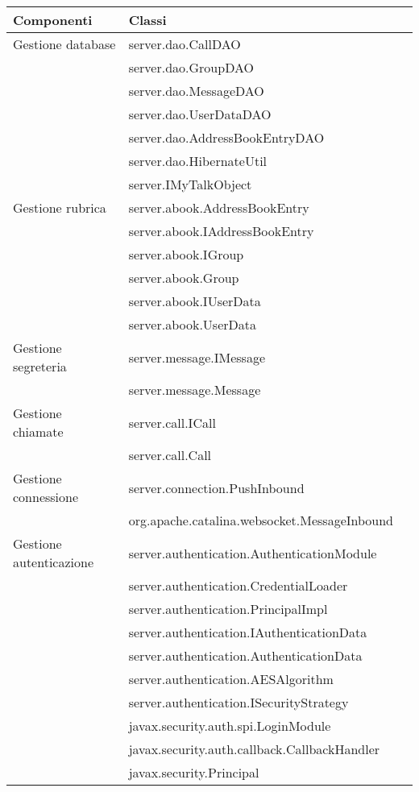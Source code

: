 \begin{center}
\begin{longtable}{lp{}l}
\toprule Componenti & Classi\\
\midrule
Gestione database & server.dao.CallDAO\\
& server.dao.GroupDAO\\
& server.dao.MessageDAO\\
& server.dao.UserDataDAO\\
& server.dao.AddressBookEntryDAO\\
& server.dao.HibernateUtil\\
& server.IMyTalkObject\\

Gestione rubrica & server.abook.AddressBookEntry\\
& server.abook.IAddressBookEntry\\
& server.abook.IGroup\\
& server.abook.Group\\
& server.abook.IUserData\\
& server.abook.UserData\\

Gestione segreteria & server.message.IMessage\\
& server.message.Message\\

Gestione chiamate & server.call.ICall\\
& server.call.Call\\

Gestione connessione & server.connection.PushInbound\\
& org.apache.catalina.websocket.MessageInbound\\

Gestione autenticazione & server.authentication.AuthenticationModule\\
& server.authentication.CredentialLoader\\
& server.authentication.PrincipalImpl\\
& server.authentication.IAuthenticationData\\
& server.authentication.AuthenticationData\\
& server.authentication.AESAlgorithm\\
& server.authentication.ISecurityStrategy\\
& javax.security.auth.spi.LoginModule\\
& javax.security.auth.callback.CallbackHandler\\
& javax.security.Principal\\


\end{longtable}
\end{center}
